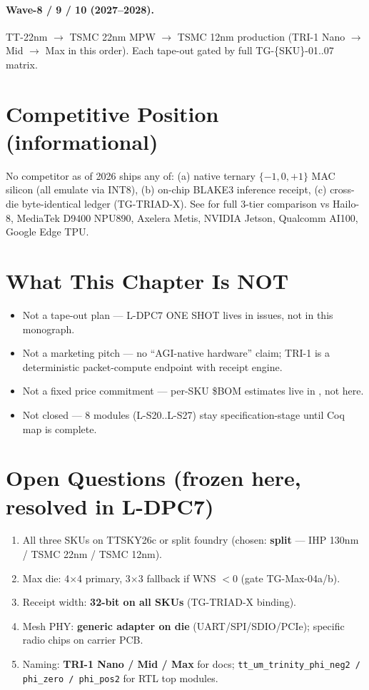 \paragraph{Wave-8 / 9 / 10 (2027--2028).}
TT-22nm $\to$ TSMC 22nm MPW $\to$ TSMC 12nm production (TRI-1 Nano $\to$
Mid $\to$ Max in this order). Each tape-out gated by full TG-\{SKU\}-01..07
matrix.

\section{Competitive Position (informational)}
\label{sec:36:competitive}

No competitor as of 2026 ships any of: (a) native ternary $\{-1,0,+1\}$ MAC
silicon (all emulate via INT8), (b) on-chip BLAKE3 inference receipt,
(c) cross-die byte-identical ledger (TG-TRIAD-X). See
 for full 3-tier comparison vs Hailo-8,
MediaTek D9400 NPU890, Axelera Metis, NVIDIA Jetson, Qualcomm AI100,
Google Edge TPU.

\section{What This Chapter Is NOT}
\label{sec:36:not}

\begin{itemize}
  \item Not a tape-out plan --- L-DPC7 ONE SHOT lives in  issues, not in this monograph.
  \item Not a marketing pitch --- no \enquote{AGI-native hardware} claim;
        TRI-1 is a deterministic packet-compute endpoint with receipt engine.
  \item Not a fixed price commitment --- per-SKU \$BOM estimates live in
        , not here.
  \item Not closed --- 8 modules (L-S20..L-S27) stay specification-stage
        until Coq map is complete.
\end{itemize}

\section{Open Questions (frozen here, resolved in L-DPC7)}
\label{sec:36:open}

\begin{enumerate}
  \item All three SKUs on TTSKY26c or split foundry (chosen: \textbf{split} --- IHP 130nm / TSMC 22nm / TSMC 12nm).
  \item Max die: 4$\times$4 primary, 3$\times$3 fallback if WNS $< 0$ (gate TG-Max-04a/b).
  \item Receipt width: \textbf{32-bit on all SKUs} (TG-TRIAD-X binding).
  \item Mesh PHY: \textbf{generic adapter on die} (UART/SPI/SDIO/PCIe); specific radio chips on carrier PCB.
  \item Naming: \textbf{TRI-1 Nano / Mid / Max} for docs; \texttt{tt\_um\_trinity\_phi\_neg2 / phi\_zero / phi\_pos2} for RTL top modules.
\end{enumerate}

